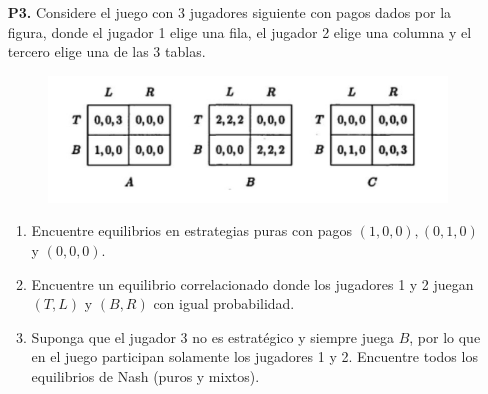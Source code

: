 \documentclass[11pt, spanish]{article}
\theoremstyle{plain}
\begin{document}
\begin{itemize}
\item[\textbf{P3.}] Considere el juego con 3 jugadores siguiente con pagos dados por la figura, donde el jugador 1 elige una fila, el jugador 2 elige una columna y el tercero elige una de las 3 tablas.
\begin{figure}[h!]
    \centering
    \includegraphics[scale=0.4]{Tablas.png}
    \label{fig:my_label}
\end{figure}
\begin{enumerate}
    \item Encuentre equilibrios en estrategias puras con pagos $(1,0,0), (0,1,0)$ y $(0,0,0)$.
    \item Encuentre un equilibrio correlacionado donde los jugadores 1 y 2 juegan $(T,L)$ y $(B,R)$ con igual probabilidad.
    \item Suponga que el jugador 3 no es estratégico y siempre juega $B$, por lo que en el juego participan solamente los jugadores 1 y 2. Encuentre todos los equilibrios de Nash (puros y mixtos).
\end{enumerate}



\end{itemize}
\end{document}

